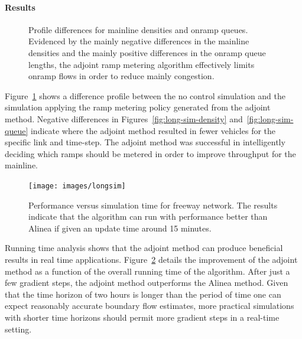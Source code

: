 \paragraph{Results}

\begin{figure}[t]
\hfill{}

\caption{Profile differences for mainline densities and onramp queues. Evidenced
by the mainly negative differences in the mainline densities and the
mainly positive differences in the onramp queue lengths, the adjoint
ramp metering algorithm effectively limits onramp flows in order to
reduce mainly congestion.\label{fig:long-sim}}
\end{figure}


Figure~\ref{fig:long-sim} shows a difference profile between the
no control simulation and the simulation applying the ramp metering
policy generated from the adjoint method. Negative differences in
Figures~\ref{fig:long-sim-density} and~\ref{fig:long-sim-queue}
indicate where the adjoint method resulted in fewer vehicles for the
specific link and time-step. The adjoint method was successful in
intelligently deciding which ramps should be metered in order to improve
throughput for the mainline.
\begin{figure}
\begin{centering}
\texttt{[image: images/longsim]}
\par\end{centering}
\caption{Performance versus simulation time for freeway network. The results
indicate that the algorithm can run with performance better than Alinea
if given an update time around 15 minutes.}\label{fig:running-time}
\end{figure}


Running time analysis shows that the adjoint method can produce beneficial
results in real time applications. Figure~\ref{fig:running-time} details the improvement of the adjoint method as a function of the overall running time of the algorithm. After just a few gradient steps, the
adjoint method outperforms the Alinea method. Given that the time
horizon of two hours is longer than the period of time one can expect
reasonably accurate boundary flow estimates, more practical simulations
with shorter time horizons should permit more gradient steps in a
real-time setting.

